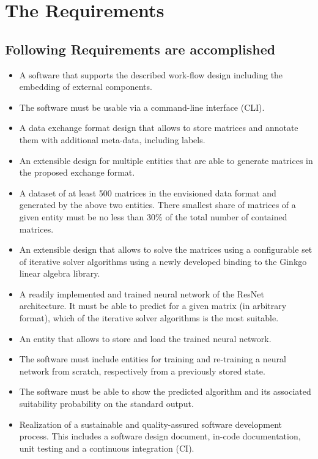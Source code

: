 \documentclass[parskip=full]{scrartcl}
\begin{document}

\section{The Requirements}
\subsection{Following Requirements are accomplished}
\begin{itemize}

\item A software that supports the described work-flow design including the embedding of external components.

\item The software must be usable via a \gls{command-line interface} (CLI).

\item A data exchange format design that allows to store matrices and annotate them with 
additional meta-data, including labels.

\item An extensible design for multiple entities that are able to generate matrices in the proposed exchange format.

\item A dataset of at least 500 matrices in the envisioned data format and generated by the above two entities. 
There smallest share of matrices of a given entity must be no less than 30\% of the total number of contained matrices.

\item An extensible design that allows to solve the matrices using a configurable set of \gls{iterative solver} algorithms using a newly developed binding to the \gls{Ginkgo} linear algebra library.

\item A readily implemented and trained \gls{neural network} of the \gls{ResNet} architecture. 
It must be able to predict for a given matrix (in arbitrary format), which of the \gls{iterative solver} algorithms is the most suitable.

\item An entity that allows to store and load the trained \gls{neural network}.

\item The software must include entities for training and re-training a \gls{neural network} from scratch, respectively from a previously stored state.

\item The software must be able to show the predicted \gls{algorithm} and its associated suitability probability on the standard output.

\item Realization of a sustainable and quality-assured software development process. 
This includes a software design document, in-code documentation, unit testing and a continuous integration (CI).

\end{itemize}
\end{document}
